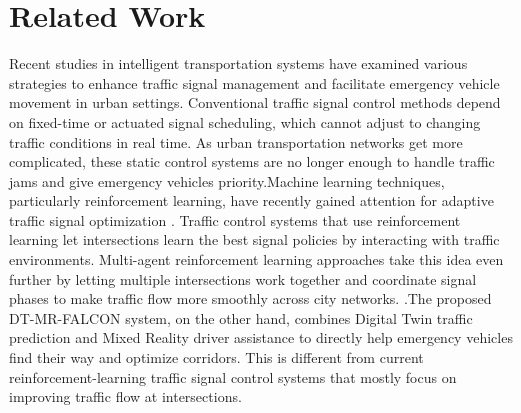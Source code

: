 \documentclass[conference]{IEEEtran}
\begin{document}
\section{Related Work}
Recent studies in intelligent transportation systems have examined various strategies to enhance traffic signal management and facilitate emergency vehicle movement in urban settings. Conventional traffic signal control methods depend on fixed-time or actuated signal scheduling, which cannot adjust to changing traffic conditions in real time. As urban transportation networks get more complicated, these static control systems are no longer enough to handle traffic jams and give emergency vehicles priority.Machine learning techniques, particularly reinforcement learning, have recently gained attention for adaptive traffic signal optimization \cite{b1,b2,b3,b5}. Traffic control systems that use reinforcement learning let intersections learn the best signal policies by interacting with traffic environments. Multi-agent reinforcement learning approaches take this idea even further by letting multiple intersections work together and coordinate signal phases to make traffic flow more smoothly across city networks. \cite{b9}.The proposed DT-MR-FALCON system, on the other hand, combines Digital Twin traffic prediction and Mixed Reality driver assistance to directly help emergency vehicles find their way and optimize corridors. This is different from current reinforcement-learning traffic signal control systems that mostly focus on improving traffic flow at intersections.
\end{document}
